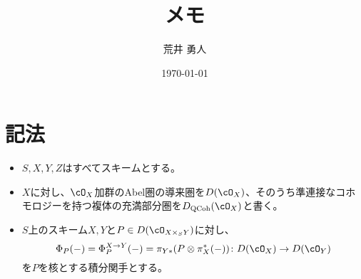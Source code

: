 \documentclass[uplatex, a4paper, dvipdfmx]{jsarticle}
\title{メモ}
\author{荒井 勇人}
\date{\today}
\theoremstyle{definition}
\DeclareMathOperator{\QCoh}{\mathrm{QCoh}}
\begin{document}
\maketitle
\section{記法}
\begin{itemize}
    \item $S, X, Y, Z$はすべてスキームとする。
    \item $X$に対し、$\cO_X$加群のAbel圏の導来圏を$D(\cO_X)$、そのうち準連接なコホモロジーを持つ複体の充満部分圏を$D_{\QCoh}(\cO_X)$と書く。
    \item $S$上のスキーム$X, Y$と$P \in D(\cO_{X \times_S Y})$に対し、$$\Phi_P(-) = \Phi_P^{X \to Y}(-) = \pi_{Y*}(P \otimes \pi_X^*(-)) \colon D(\cO_X) \to D(\cO_Y)$$を$P$を核とする積分関手とする。
\end{itemize}
\end{document}

